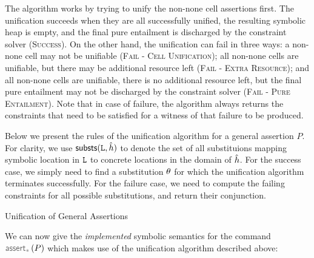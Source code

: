 The algorithm works by trying to unify the non-none cell assertions first. 
The unification succeeds when they are all successfully unified, the resulting symbolic heap is empty, 
and the final pure entailment is discharged by the constraint solver (\textsc{Success}). 
On the other hand, the unification can fail in three
ways: 
a non-none cell may not be unifiable (\textsc{Fail - Cell Unification}); 
all non-none cells are unifiable, but there may be additional resource left (\textsc{Fail - Extra Resource}); 
and all non-none cells are unifiable, there is no additional resource left, but the final
pure entailment may not be discharged by the constraint solver (\textsc{Fail - Pure Entailment}). 
Note that in case of failure, the algorithm 
always returns the constraints that need to be satisfied for a witness of that failure to be produced. 

Below we present the rules of the unification algorithm for a general assertion $P$.
For clarity, we use ${\sf substs}(\mathtt{L}, \hat{h})$ to denote the set of all substituions
mapping symbolic location in $\mathtt{L}$ to concrete locations in the domain of $\hat{h}$. 
%
For the success case, we simply need to find a substitution $\theta$ 
for which the unification algorithm terminates successfully. For the failure case, 
we need to compute the failing constraints for all possible substitutions, and 
return their conjunction. 


\begin{display}{Unification of General Assertions}
%
 \qquad
 \end{display}

We can now give the \emph{implemented} symbolic semantics for the command $\sepassert(P)$ 
which makes use of the unification algorithm described above: 
{\small {}}


